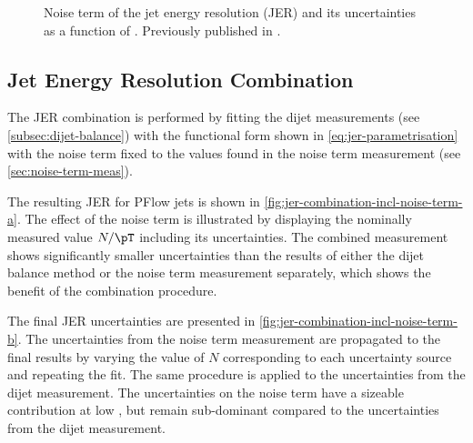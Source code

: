 % 
% 



\begin{figure}
    \caption{Noise term of the jet energy resolution (JER) and its uncertainties as a function of \abseta. Previously published in .}
    \label{fig:noise-term-results-pflow}
\end{figure}


\subsection{Jet Energy Resolution Combination}
\label{subsec:jer-combination}
The JER combination is performed by fitting the dijet \insitu measurements (see \cref{subsec:dijet-balance}) with the functional form shown in \cref{eq:jer-parametrisation} with the noise term fixed to the values found in the noise term measurement (see \cref{sec:noise-term-meas}).

The resulting JER for PFlow jets is shown in \cref{fig:jer-combination-incl-noise-term-a}. The effect of the noise term is illustrated by displaying the nominally measured value $N / \pT$ including its uncertainties.
The combined \insitu measurement shows significantly smaller uncertainties than the results of either the dijet balance method or the noise term measurement separately, which shows the benefit of the combination procedure.

The final JER uncertainties are presented in \cref{fig:jer-combination-incl-noise-term-b}.
The uncertainties from the noise term measurement are propagated to the final results by varying the value of $N$ corresponding to each uncertainty source and repeating the fit. %
The same procedure is applied to the uncertainties from the dijet \insitu measurement.
The uncertainties on the noise term have a sizeable contribution at low \pT, but remain sub-dominant compared to the uncertainties from the dijet measurement.

